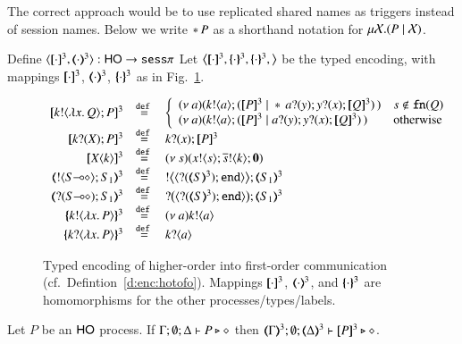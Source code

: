 The correct approach would be to use replicated shared names
as triggers instead of session names. 
Below we write $\ast\,{} P$ as a shorthand notation for $\mu \mathcal{X}. (P \;|\; \mathcal{X})$.

\begin{definition}\label{d:enc:hotofo}
	Define $\encod{\cdot}{\cdot}{3}: \HO \to \sessp$ 
	Let $\enco{\map{\cdot}^3, \mapa{\cdot}^3, \mapa{\cdot}^3,}$ be the typed encoding, with mappings 
	$[\!\![\cdot]\!\!]^{3}$, $(\!\!\langle\cdot\rangle\!\!)^{3}$, $\{\!\!\{\cdot\}\!\!\}^{3}$ as
	in Fig.~\ref{f:enc:hotofo}.
	\begin{figure}[t]
	\[
	\begin{array}{rcl}
		\pmap{\bout{k}{\abs{x}{Q}} P}{3} & \defeq &  \left\{
		\begin{array}{ll}
			\newsp{a}{\bout{k}{a} (\pmap{P}{3} \Par \repl{} \binp{a}{y} \binp{y}{x} \pmap{Q}{3})\,} & s \notin \fn{Q} \\
			\newsp{a}{\bout{k}{a} (\pmap{P}{3} \Par \binp{a}{y} \binp{y}{x} \pmap{Q}{3})\,} & \textrm{otherwise} %
		\end{array}
		\right.
		\\
		\pmap{\binp{k}{X} P}{3} &\defeq&  \binp{k}{x} \pmap{P}{3}\\
		\pmap{\appl{X}{k}}{3} & \defeq & \newsp{s}{\bout{x}{s} \bout{\dual{s}}{k} \inact}\\
		\tmap{\btout{\lhot{S}}S_1}{3} & \defeq & \bbtout{\chtype{\btinp{\tmap{S}{3}}\tinact}}\tmap{S_1}{3} \\
		\tmap{\btinp{\lhot{S}}S_1}{3} & \defeq & \bbtinp{\chtype{\btinp{\tmap{S}{3}}\tinact}}\tmap{S_1}{3} \\
		\mapa{\bactout{k}{\abs{ x}{P}} }^3 &  \defeq & \news{a} \bactout{k}{a} \\
		\mapa{\bactinp{k}{\abs{ x}{P}} }^3 &  \defeq & \bactinp{k}{a}
	\end{array}
	\]
	\caption{
Typed encoding of higher-order  into first-order communication (cf.~Defintion~\ref{d:enc:hotofo}).
\label{f:enc:hotofo}
Mappings 
$[\!\![\cdot]\!\!]^3$,
$(\!\!\langle\cdot\rangle\!\!)^3$, 
and 
$\{\!\!\{\cdot\}\!\!\}^3$
are homomorphisms for the other processes/types/labels. 
}
\end{figure}
\end{definition}

\begin{proposition}\label{prop:typepres3}
Let $P$ be an  $\mathsf{HO}$ process. 
If			$\Gamma; \emptyset; \Delta \vdash P \triangleright \diamond$ then 
			$\mapt{\Gamma}^{3}; \emptyset; \mapt{\Delta}^{3} \proves \map{P}^{3} \hastype \Proc$. 
\end{proposition}


